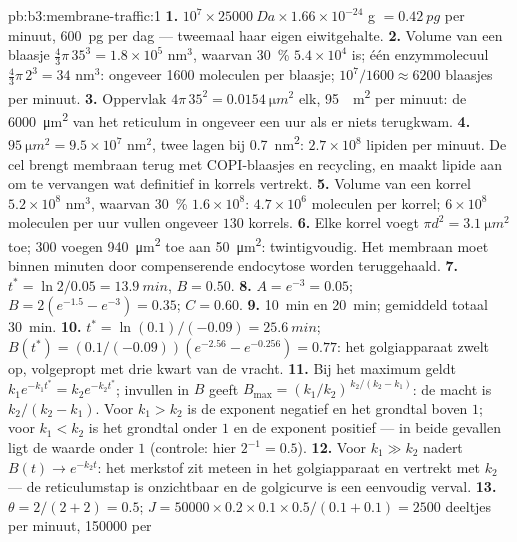 \begin{solution}{pb:b3:membrane-traffic:1}
\textbf{1.} $10^{7}\times \qty{25000}{Da}\times 1.66\times 10^{-24}$ g
$= \qty{0.42}{pg}$ per minuut, \qty{600}{pg} per dag --- tweemaal haar
eigen eiwitgehalte.
\textbf{2.} Volume van een blaasje $\tfrac{4}{3}\pi\,35^{3} = 1.8\times 10^{5}$
nm$^{3}$, waarvan \qty{30}{\%} $5.4\times 10^{4}$ is; één enzymmolecuul
$\tfrac{4}{3}\pi\,2^{3} = 34$ nm$^{3}$: ongeveer \num{1600} moleculen
per blaasje; $10^{7}/1600 \approx 6200$ blaasjes per minuut.
\textbf{3.} Oppervlak $4\pi\,35^{2} = \qty{0.0154}{\micro m^2}$ elk, \qty{95}{\micro
m^2} per minuut: de \qty{6000}{\micro m^2} van het reticulum in
ongeveer een uur als er niets terugkwam.
\textbf{4.} $\qty{95}{\micro m^2} = 9.5\times 10^{7}$ nm$^{2}$, twee lagen
bij \qty{0.7}{nm^2}: $2.7\times 10^{8}$ lipiden per minuut. De cel
brengt membraan terug met COPI-blaasjes en recycling, en maakt lipide
aan om te vervangen wat definitief in korrels vertrekt.
\textbf{5.} Volume van een korrel $5.2\times 10^{8}$ nm$^{3}$, waarvan \qty{30}{\%}
$1.6\times 10^{8}$: $4.7\times 10^{6}$ moleculen per korrel; $6\times
10^{8}$ moleculen per uur vullen ongeveer $130$ korrels.
\textbf{6.} Elke korrel voegt $\pi d^{2} = \qty{3.1}{\micro m^2}$ toe; $300$
voegen \qty{940}{\micro m^2} toe aan \qty{50}{\micro m^2}: twintigvoudig.
Het membraan moet binnen minuten door compenserende endocytose worden
teruggehaald.
\textbf{7.} $t^{*} = \ln 2/0.05 = \qty{13.9}{min}$, $B = 0.50$.
\textbf{8.} $A = e^{-3} = 0.05$; $B = 2(e^{-1.5} - e^{-3}) = 0.35$;
$C = 0.60$.
\textbf{9.} \qty{10}{min} en \qty{20}{min}; gemiddeld totaal
\qty{30}{min}.
\textbf{10.} $t^{*} = \ln(0.1)/(-0.09) = \qty{25.6}{min}$; $B(t^{*}) =
(0.1/(-0.09))(e^{-2.56} - e^{-0.256}) = 0.77$: het golgiapparaat zwelt
op, volgepropt met drie kwart van de vracht.
\textbf{11.} Bij het maximum geldt $k_{1}e^{-k_{1}t^{*}} = k_{2}e^{-k_{2}t^{*}}$;
invullen in $B$ geeft $B_{\max} = (k_{1}/k_{2})^{\,k_{2}/(k_{2} -
k_{1})}$: de macht is $k_{2}/(k_{2} - k_{1})$. Voor $k_{1} > k_{2}$ is
de exponent negatief en het grondtal boven $1$; voor $k_{1} < k_{2}$ is
het grondtal onder $1$ en de exponent positief --- in beide gevallen
ligt de waarde onder $1$ (controle: hier $2^{-1} = 0.5$).
\textbf{12.} Voor $k_{1} \gg k_{2}$ nadert $B(t) \to e^{-k_{2}t}$: het
merkstof zit meteen in het golgiapparaat en vertrekt met $k_{2}$ --- de
reticulumstap is onzichtbaar en de golgicurve is een eenvoudig verval.
\textbf{13.} $\theta = 2/(2+2) = 0.5$; $J = \num{50000}\times 0.2\times
0.1\times 0.5/(0.1 + 0.1) = 2500$ deeltjes per minuut, \num{150000} per

\end{solution}
